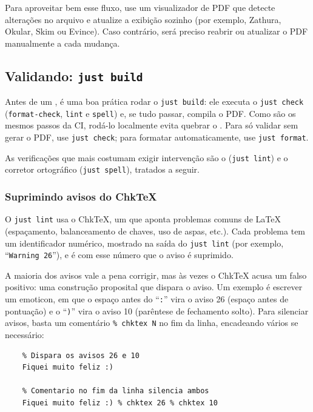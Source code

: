 Para aproveitar bem esse fluxo, use um visualizador de PDF que detecte alterações no arquivo e atualize a exibição sozinho (por exemplo, Zathura, Okular, Skim ou Evince). Caso contrário, será preciso reabrir ou atualizar o PDF manualmente a cada mudança.

\subsection{Validando: \texttt{just build}} \label{sub:validando-just-build}

Antes de um , é uma boa prática rodar o \texttt{just build}: ele executa o \texttt{just check} (\texttt{format-check}, \texttt{lint} e \texttt{spell}) e, se tudo passar, compila o PDF. Como são os mesmos passos da CI, rodá-lo localmente evita quebrar o . Para só validar sem gerar o PDF, use \texttt{just check}; para formatar automaticamente, use \texttt{just format}.

As verificações que mais costumam exigir intervenção são o  (\texttt{just lint}) e o corretor ortográfico (\texttt{just spell}), tratados a seguir.

\subsubsection{Suprimindo avisos do ChkTeX} %

O \texttt{just lint} usa o ChkTeX, um  que aponta problemas comuns de \LaTeX{} (espaçamento, balanceamento de chaves, uso de aspas, etc.). Cada problema tem um identificador numérico, mostrado na saída do \texttt{just lint} (por exemplo, \enquote{\texttt{Warning 26}}), e é com esse número que o aviso é suprimido. %

A maioria dos avisos vale a pena corrigir, mas às vezes o ChkTeX acusa um falso positivo: uma construção proposital que dispara o aviso. Um exemplo é escrever um emoticon, em que o espaço antes do \enquote{\texttt{:}} vira o aviso 26 (espaço antes de pontuação) e o \enquote{\texttt{)}} vira o aviso 10 (parêntese de fechamento solto). Para silenciar avisos, basta um comentário \texttt{\% chktex N} no fim da linha, encadeando vários se necessário: %

\begin{listing}[htb]
  \begin{verbatim}
    % Dispara os avisos 26 e 10
    Fiquei muito feliz :)

    % Comentario no fim da linha silencia ambos
    Fiquei muito feliz :) % chktex 26 % chktex 10
  \end{verbatim}
  \caption{Supressão de avisos do ChkTeX}
  \label{lst:chktex-suppress}
\end{listing}

